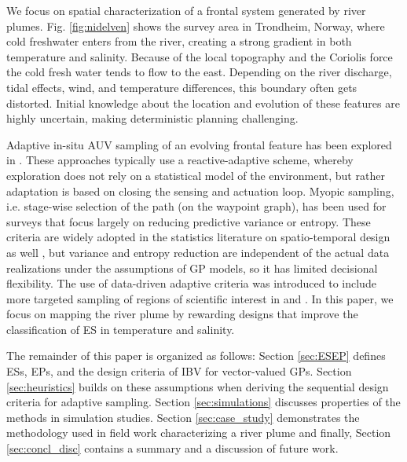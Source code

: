 \documentclass[aoas]{imsart}
\begin{document}
We focus on spatial characterization of a frontal system generated by
river plumes. Fig. \ref{fig:nidelven} shows the survey area in
Trondheim, Norway, where cold freshwater enters from the river,
creating a strong gradient in both temperature and salinity. Because
of the local topography and the Coriolis force the cold fresh water
tends to flow to the east. Depending on the river discharge, tidal
effects, wind, and temperature differences, this boundary often gets
distorted. Initial knowledge about the location and evolution of these
features are highly uncertain, making deterministic planning
challenging.

Adaptive in-situ AUV sampling of an evolving frontal feature has been
explored in \cite{fronts11,Zhang2012,Pinto2018,costa19}. These
approaches typically use a reactive-adaptive scheme, whereby
exploration does not rely on a statistical model of the environment,
but rather adaptation is based on closing the sensing and actuation
loop. Myopic sampling, i.e. stage-wise selection of the path (on the
waypoint graph), has been used for surveys
\citep{singh2009efficient,Binney2013} that focus largely on reducing
predictive variance or entropy. These criteria are widely adopted in
the statistics literature on spatio-temporal design as well
\cite{bueso1998state,zidek2019monitoring}, but variance and entropy
reduction are independent of the actual data realizations under the
assumptions of GP models, so it has limited
decisional flexibility. The use of data-driven adaptive criteria
was introduced to include more targeted sampling of regions of
scientific interest in \cite{Low2009} and \cite{fossuminformation}. In
this paper, we focus on mapping the river plume by rewarding designs
that improve the classification of ES in temperature and salinity.

The remainder of this paper is organized as follows: 
Section \ref{sec:ESEP} defines ESs, EPs, and the design criteria of IBV for
vector-valued GPs. Section \ref{sec:heuristics} builds on these
assumptions when deriving the sequential design criteria for adaptive
sampling. Section \ref{sec:simulations} discusses properties of the
methods in simulation studies. Section \ref{sec:case_study}
demonstrates the methodology used in field work characterizing a river
plume and finally, Section \ref{sec:concl_disc} contains a summary and
a discussion of future work.
%
\end{document}
